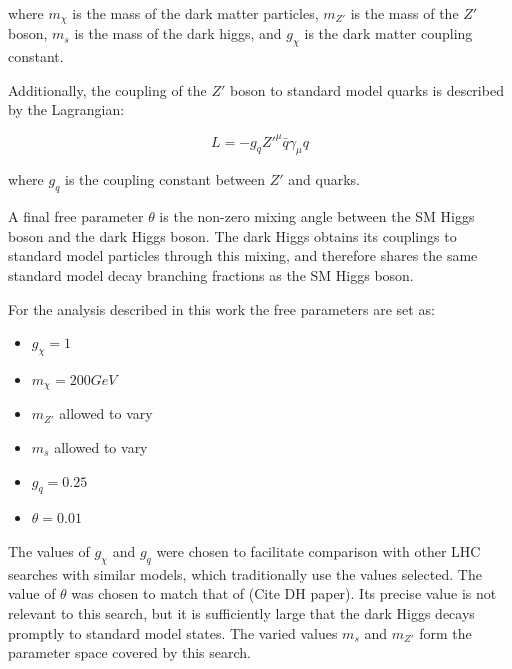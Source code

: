 where $m_{\chi}$ is the mass of the dark matter particles, $m_{Z'}$ is the mass of the $Z'$ boson, $m_{s}$ is the mass of the dark higgs, and $g_{\chi}$ is the dark matter coupling constant.

Additionally, the coupling of the $Z'$ boson to standard model quarks is described by the Lagrangian:

$$ L = -g_qZ'^{\mu}\bar{q}\gamma_{\mu}q $$

where $g_q$ is the coupling constant between $Z'$ and quarks.

A final free parameter $\theta$ is the non-zero mixing angle between the SM Higgs boson and the dark Higgs boson. The dark Higgs obtains its couplings to standard model particles through this mixing, and therefore shares the same standard model decay branching fractions as the SM Higgs boson.

For the analysis described in this work the free parameters are set as:

\begin{itemize}
    \item $g_{\chi} = 1$
    \item $m_{\chi} = 200 GeV$
    \item $m_{Z'}$ allowed to vary
    \item $m_s$ allowed to vary
    \item $g_q = 0.25$
    \item $\theta = 0.01$ 
\end{itemize}

The values of $g_{\chi}$ and $g_{q}$ were chosen to facilitate comparison with other LHC searches with similar models, which traditionally use the values selected. The value of $\theta$ was chosen to match that of (Cite DH paper). Its precise value is not relevant to this search, but it is sufficiently large that the dark Higgs decays promptly to standard model states. The varied values $m_s$ and $m_{Z'}$ form the parameter space covered by this search. 
